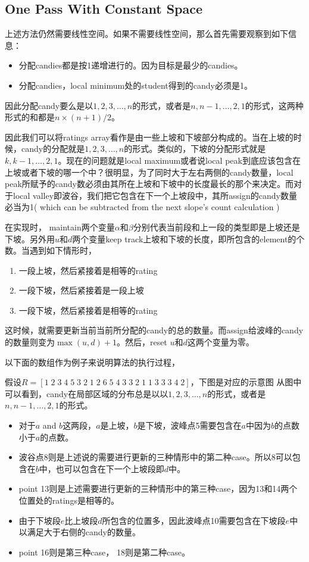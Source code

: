 \subsection{One Pass With Constant Space}
上述方法仍然需要线性空间。如果不需要线性空间，那么首先需要观察到如下信息：
\begin{itemize}
\item 分配candies都是按1递增进行的。因为目标是最少的candies。
\item 分配candies，local minimum处的student得到的candy必须是1。
\end{itemize}
因此分配candy要么是以$1,2,3,\ldots,n$的形式，或者是$n, n-1, \ldots, 2, 1$的形式，这两种形式的和都是$n\times(n+1)/2$。
\par
因此我们可以将ratings array看作是由一些上坡和下坡部分构成的。当在上坡的时候，candy的分配就是$1,2,3,\ldots,n$的形式。类似的，下坡的分配形式就是$k, k-1, \ldots, 2,1$。现在的问题就是local maximum或者说local peak到底应该包含在上坡或者下坡的哪一个中？很明显，为了同时大于左右两侧的candy数量，local peak所赋予的candy数必须由其所在上坡和下坡中的长度最长的那个来决定。而对于local valley即波谷，我们把它包含在下一个上坡段中，其所assign的candy数量必当为1( which can be subtracted from the next slope's count calculation )
\par
在实现时， maintain两个变量$\alpha$和$\beta$分别代表当前段和上一段的类型即是上坡还是下坡。另外用$u$和$d$两个变量keep track上坡和下坡的长度，即所包含的element的个数。当遇到如下情形时，
\begin{enumerate}
\item 一段上坡，然后紧接着是相等的rating
\item 一段下坡，然后紧接着是一段上坡
\item 一段下坡，然后紧接着是相等的rating
\end{enumerate}
这时候，就需要更新当前当前所分配的candy的总的数量。而assign给波峰的candy的数量则变为$\max(u,d)+1$。然后，reset $u$和$d$这两个变量为零。
\par
以下面的数组作为例子来说明算法的执行过程，
\par
假设$R=[1\;2\; 3\; 4\; 5\; 3\; 2\; 1\; 2\; 6\; 5\; 4\; 3\; 3\; 2\; 1\; 1\; 3\; 3\; 3\; 4\; 2]$，下图是对应的示意图
从图中可以看到，candy在局部区域的分布总是以以$1,2,3,\ldots,n$的形式，或者是$n, n-1, \ldots, 2, 1$的形式。
\begin{itemize}
\item 对于$a$ and $b$这两段，$a$是上坡，$b$是下坡，波峰点5需要包含在$a$中因为$b$的点数小于$a$的点数。
\item 波谷点8则是上述说的需要进行更新的三种情形中的第二种case。所以8可以包含在$b$中，也可以包含在下一个上坡段即$d$中。
\item point 13则是上述需要进行更新的三种情形中的第三种case，因为13和14两个位置处的ratings是相等的。
\item 由于下坡段$e$比上坡段$d$所包含的位置多，因此波峰点10需要包含在下坡段$e$中以满足大于右侧的candy的数量。
\item point 16则是第三种case， 18则是第二种case。
\end{itemize}
